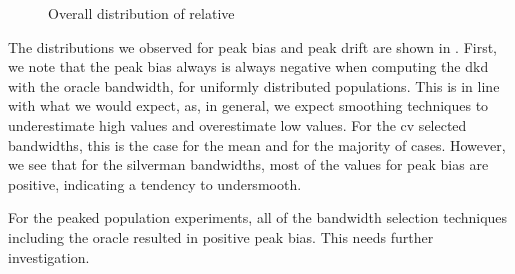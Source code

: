 \begin{figure}[htbp]
\begin{subfigure}[t]{0.45\textwidth}
        \label{fig:discussion:overall_peakdrift_boxplot:peak}
    \end{subfigure}
    \caption{Overall distribution of relative }
    \label{fig:discussion:overall_peakdrift_boxplot}
\end{figure}

The distributions we observed for \gls{peak bias} and \gls{peak drift} are shown in .
First, we note that the \gls{peak bias} always is always negative when computing the \gls{dkd} with the \gls{oracle} bandwidth,
for uniformly distributed populations.
This is in line with what we would expect,
as, in general, we expect smoothing techniques to underestimate high values and overestimate low values.
For the \gls{cv} selected bandwidths, this is the case for the mean and for the majority of cases.
However, we see that for the \gls{silverman} bandwidths,
most of the values for \gls{peak bias} are positive,
indicating a tendency to undersmooth.

For the peaked population experiments, all of the bandwidth selection techniques including the \gls{oracle} resulted in positive \gls{peak bias}.
This needs further investigation.


